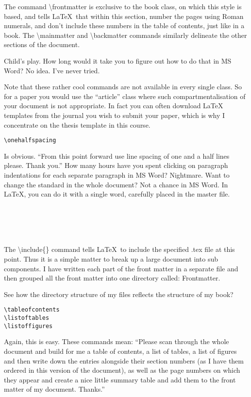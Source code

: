 The command {\textbackslash}frontmatter is exclusive to the book class, on which this style is based, and tells \LaTeX\ that within this section, number the pages using Roman numerals, and don't include these numbers in the table of contents, just like in a book. The {\textbackslash}mainmatter and {\textbackslash}backmatter commands similarly delineate the other sections of the document.

Child's play.  How long would it take you to figure out how to do that in MS Word? No idea. I've never tried.

Note that these rather cool commands are not available in every single class. So for a paper you would use the ``article'' class where such compartmentalisation of your document is not appropriate. In fact you can often download \LaTeX\,templates from the journal you wish to submit your paper, which is why I concentrate on the thesis template in this course.

\begin{verbatim}
\onehalfspacing
\end{verbatim}

Is obvious. ``From this point forward use line spacing of one and a half lines please. Thank you.'' How many hours have you spent clicking on paragraph indentations for each separate paragraph in MS Word? Nightmare. Want to change the standard in the whole document? Not a chance in MS Word. In \LaTeX, you can do it with a single word, carefully placed in the master file.

\begin{verbatim}





\end{verbatim}

The {\textbackslash}include\{\} command tells \LaTeX\, to include the specified .tex file at this point.  Thus it is a simple matter to break up a large document into sub components.  I have written each part of the front matter in a separate file and then grouped all the front matter into one directory called: Frontmatter.

See how the directory structure of my files reflects the structure of my book?

\begin{verbatim}
\tableofcontents
\listoftables
\listoffigures
\end{verbatim}

Again, this is easy. These commands mean: ``Please scan through the whole document and build for me a table of contents, a list of tables, a list of figures and then write down the entries alongside their section numbers (as I have them ordered in this version of the document), as well as the page numbers on which they appear and create a nice little summary table and add them to the front matter of my document. Thanks.''

